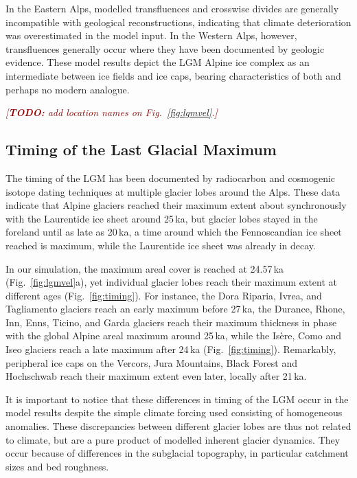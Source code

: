 \documentclass[tc, manuscript]{copernicus}
\newcommand{\todo}[1]{\textcolor{darkred}{\emph{[\textbf{TODO:} #1]}}}
\begin{document}
    In the Eastern Alps, modelled transfluences and crosswise divides are
    generally incompatible with geological reconstructions, indicating that
    climate deterioration was overestimated in the model input. In the Western
    Alps, however, transfluences generally occur where they have been
    documented by geologic evidence. These model results depict the LGM Alpine
    ice complex as an intermediate between ice fields and ice caps, bearing
    characteristics of both and perhaps no modern analogue.

    \todo{add location names on Fig.~\ref{fig:lgmvel}.}



\subsection{Timing of the Last Glacial Maximum}
\label{sec:timing}

    The timing of the LGM has been documented by radiocarbon and cosmogenic
    isotope dating techniques at multiple glacier lobes around the Alps.
    These data indicate that Alpine glaciers reached their maximum extent
    about synchronously with the Laurentide ice sheet around 25\,ka, but
    glacier lobes stayed in the foreland until as late as 20\,ka, a time
    around which the Fennoscandian ice sheet reached is maximum, while the
    Laurentide ice sheet was already in decay.

    In our simulation, the maximum areal cover is reached at 24.57\,ka
    (Fig.~\ref{fig:lgmvel}a), yet individual glacier lobes reach their
    maximum extent at different ages (Fig.~\ref{fig:timing}). For instance, the
    Dora Riparia, Ivrea, and Tagliamento glaciers reach an early maximum before
    27\,ka, the Durance, Rhone, Inn, Enns, Ticino, and Garda glaciers reach
    their maximum thickness in phase with the global Alpine areal maximum
    around 25\,ka, while the Isère, Como and Iseo glaciers reach a late maximum
    after 24\,ka (Fig.~\ref{fig:timing}). Remarkably, peripheral ice caps on
    the Vercors, Jura Mountains, Black Forest and Hochschwab reach their
    maximum extent even later, locally after 21\,ka.

    It is important to notice that these differences in timing of the LGM occur
    in the model results despite the simple climate forcing used consisting of
    homogeneous anomalies. These discrepancies between different glacier lobes
    are thus not related to climate, but are a pure product of modelled
    inherent glacier dynamics. They occur because of differences in the
    subglacial topography, in particular catchment sizes and bed roughness.
\end{document}

